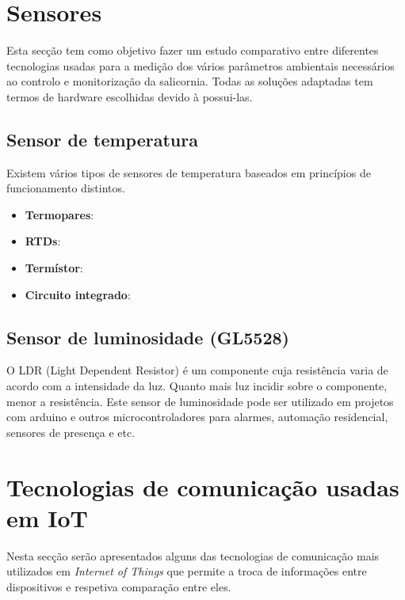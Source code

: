 \newpage
\section{Sensores}


Esta secção tem como objetivo fazer um estudo comparativo entre diferentes tecnologias usadas para a medição dos vários parâmetros ambientais necessários ao controlo e monitorização da salicornia. Todas as soluções adaptadas tem termos de hardware escolhidas devido à possui-las. 

\subsection{Sensor de temperatura }
Existem vários tipos de sensores de temperatura baseados em princípios de funcionamento distintos. 


\begin{itemize}
	\item \textbf{Termopares}: 
	\item \textbf{RTDs}:
	\item \textbf{Termístor}: 
	\item \textbf{Circuito integrado}: 
\end{itemize}








\newpage

\subsection{Sensor de luminosidade (GL5528)}


O LDR (Light Dependent Resistor) é um componente cuja resistência varia de acordo com a intensidade da luz. Quanto mais luz incidir sobre o componente, menor a resistência. Este sensor de luminosidade pode ser utilizado em projetos com arduino e outros microcontroladores para alarmes, automação residencial, sensores de presença e etc.






\section{Tecnologias de comunicação usadas em \ac{IoT}}

Nesta secção serão apresentados alguns das tecnologias de comunicação mais utilizados em \textit{Internet of Things} que permite a troca de informações entre dispositivos e respetiva comparação entre eles. 



